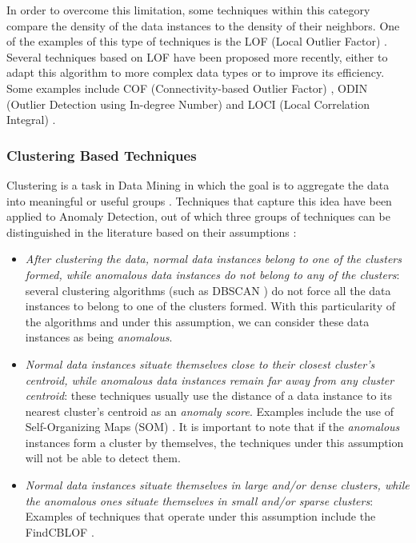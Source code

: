 In order to overcome this limitation, some techniques within this category compare the density of the data instances to the density of their neighbors. One of the examples of this type of techniques is the LOF (Local Outlier Factor) \cite{Breunig}. Several techniques based on LOF	have been proposed more recently, either to adapt this algorithm to more complex data types or to improve its efficiency. Some examples include COF (Connectivity-based Outlier Factor) \cite{Tang2002}, ODIN (Outlier Detection using In-degree Number) \cite{Hautamaki2004} and LOCI (Local Correlation Integral) \cite{PapadimitriouS.KitagawaH.2003}.

\subsubsection{Clustering Based Techniques}

Clustering is a task in Data Mining in which the goal is to aggregate the data into meaningful or useful groups \cite{Tan2005}. Techniques that capture this idea have been applied to Anomaly Detection, out of which three groups of techniques can be distinguished in the literature based on their assumptions \cite{Kandhari2009}:

\begin{itemize}
	\item \textit{After clustering the data, \textit{normal} data instances belong to one of the clusters formed, while \textit{anomalous} data instances do not belong to any of the clusters}: several clustering algorithms (such as DBSCAN \cite{Ester:1996:DAD:3001460.3001507}) do not force all the data instances to belong to one of the clusters formed. With this particularity of the algorithms and under this assumption, we can consider these data instances as being \textit{anomalous}.
	
	\item \textit{\textit{Normal} data instances situate themselves close to their closest cluster's centroid, while \textit{anomalous} data instances remain far away from any cluster centroid}: these techniques usually use the distance of a data instance to its nearest cluster's centroid as an \textit{anomaly score}. Examples include the use of Self-Organizing Maps (SOM) \cite{Kohonen:1997:SM:261082}.
	It is important to note that if the \textit{anomalous} instances form a cluster by themselves, the techniques under this assumption will not be able to detect them.
	
	\item \textit{\textit{Normal} data instances situate themselves in large and/or dense clusters, while the \textit{anomalous} ones situate themselves in small and/or sparse clusters}: Examples of techniques that operate under this assumption include the FindCBLOF \cite{He:2003:DCL:770340.770389}.
\end{itemize}

